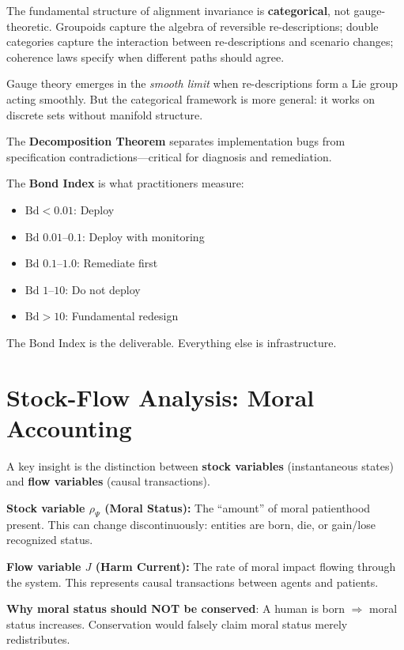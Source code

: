 \documentclass[12pt]{article}
\begin{document}
The fundamental structure of alignment invariance is \textbf{categorical}, not gauge-theoretic. Groupoids capture the algebra of reversible re-descriptions; double categories capture the interaction between re-descriptions and scenario changes; coherence laws specify when different paths should agree.

Gauge theory emerges in the \emph{smooth limit} when re-descriptions form a Lie group acting smoothly. But the categorical framework is more general: it works on discrete sets without manifold structure.

The \textbf{Decomposition Theorem} separates implementation bugs from specification contradictions---critical for diagnosis and remediation.

The \textbf{Bond Index} is what practitioners measure:
\begin{itemize}
    \item $\mathrm{Bd} < 0.01$: Deploy
    \item $\mathrm{Bd}$ $0.01$--$0.1$: Deploy with monitoring
    \item $\mathrm{Bd}$ $0.1$--$1.0$: Remediate first
    \item $\mathrm{Bd}$ $1$--$10$: Do not deploy
    \item $\mathrm{Bd} > 10$: Fundamental redesign
\end{itemize}

The Bond Index is the deliverable. Everything else is infrastructure.

\section{Stock-Flow Analysis: Moral Accounting}

A key insight is the distinction between \textbf{stock variables} (instantaneous states) and \textbf{flow variables} (causal transactions).

\textbf{Stock variable $\rho_\Psi$ (Moral Status):}
The ``amount'' of moral patienthood present. This can change discontinuously: entities are born, die, or gain/lose recognized status.

\textbf{Flow variable $J$ (Harm Current):}
The rate of moral impact flowing through the system. This represents causal transactions between agents and patients.

\textbf{Why moral status should NOT be conserved}: A human is born $\Rightarrow$ moral status increases. Conservation would falsely claim moral status merely redistributes.
\end{document}
